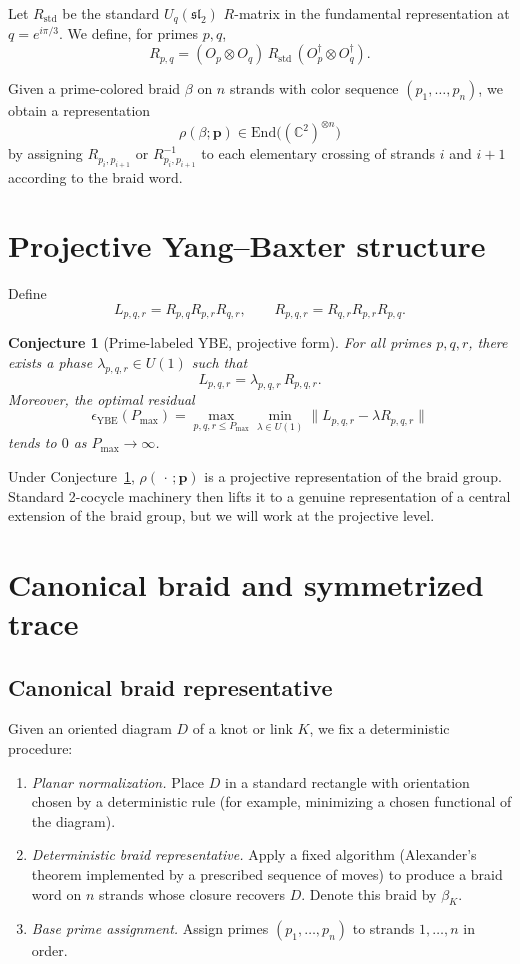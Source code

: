 \documentclass[11pt]{article}
\newtheorem{conjecture}{Conjecture}
\begin{document}
Let $R_{\mathrm{std}}$ be the standard $U_q(\mathfrak{sl}_2)$ $R$-matrix in the fundamental representation at $q=e^{i\pi/3}$.
We define, for primes $p,q$,
\[
  R_{p,q} = (O_p\otimes O_q)\,R_{\mathrm{std}}\,(O_p^\dagger\otimes O_q^\dagger).
\]

Given a prime-colored braid $\beta$ on $n$ strands with color sequence $(p_1,\dots,p_n)$, we obtain a representation
\[
  \rho(\beta;\mathbf p)\in\mathrm{End}\bigl((\mathbb C^2)^{\otimes n}\bigr)
\]
by assigning $R_{p_i,p_{i+1}}$ or $R_{p_i,p_{i+1}}^{-1}$ to each elementary crossing of strands $i$ and $i+1$ according to the braid word.

\section{Projective Yang--Baxter structure}

Define
\[
  L_{p,q,r} = R_{p,q}R_{p,r}R_{q,r},\qquad
  R_{p,q,r} = R_{q,r}R_{p,r}R_{p,q}.
\]

\begin{conjecture}[Prime-labeled YBE, projective form]
\label{conj:YBE}
For all primes $p,q,r$, there exists a phase $\lambda_{p,q,r}\in U(1)$ such that
\[
  L_{p,q,r} = \lambda_{p,q,r}\,R_{p,q,r}.
\]
Moreover, the optimal residual
\[
  \epsilon_{\mathrm{YBE}}(P_{\max})
   = \max_{p,q,r\le P_{\max}}\min_{\lambda\in U(1)}
      \|L_{p,q,r}-\lambda R_{p,q,r}\|
\]
tends to $0$ as $P_{\max}\to\infty$.
\end{conjecture}

Under Conjecture~\ref{conj:YBE}, $\rho(\,\cdot\,;\mathbf p)$ is a projective representation of the braid group.
Standard 2-cocycle machinery then lifts it to a genuine representation of a central extension of the braid group, but we will work at the projective level.

\section{Canonical braid and symmetrized trace}

\subsection{Canonical braid representative}

Given an oriented diagram $D$ of a knot or link $K$, we fix a deterministic procedure:

\begin{enumerate}[leftmargin=1.5em]
  \item \emph{Planar normalization.}
  Place $D$ in a standard rectangle with orientation chosen by a deterministic rule (for example, minimizing a chosen functional of the diagram).
  \item \emph{Deterministic braid representative.}
  Apply a fixed algorithm (Alexander's theorem implemented by a prescribed sequence of moves) to produce a braid word on $n$ strands whose closure recovers $D$.
  Denote this braid by $\beta_K$.
  \item \emph{Base prime assignment.}
  Assign primes $(p_1,\dots,p_n)$ to strands $1,\dots,n$ in order.
\end{enumerate}
\end{document}
